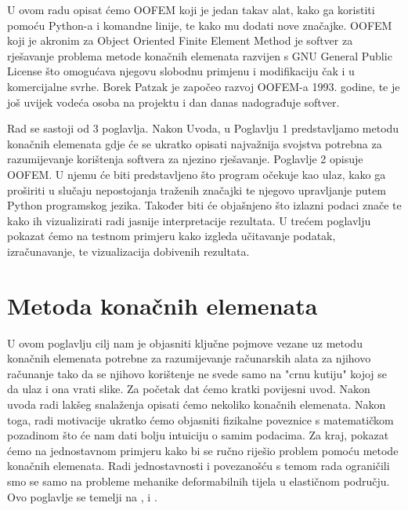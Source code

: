 \documentclass[a4paper,twoside,12pt]{memoir} %
\begin{document}
\begin{intro}
U ovom radu opisat ćemo OOFEM koji je jedan takav alat, kako ga koristiti pomoću Python-a i komandne linije, te kako mu dodati nove značajke. OOFEM koji je akronim za Object Oriented Finite Element Method je softver za rješavanje problema metode konačnih elemenata razvijen s GNU General Public License što omogućava njegovu slobodnu primjenu i modifikaciju čak i u komercijalne svrhe. Borek Patzak je  započeo razvoj OOFEM-a 1993. godine, te je još uvijek vodeća osoba na projektu i dan danas nadograđuje softver. \par

Rad se sastoji od 3 poglavlja. Nakon Uvoda, u Poglavlju 1 predstavljamo metodu konačnih elemenata gdje će se ukratko opisati najvažnija svojstva potrebna za razumijevanje korištenja softvera za njezino rješavanje. Poglavlje 2 opisuje OOFEM. U njemu će biti predstavljeno što program očekuje kao ulaz, kako ga proširiti u slučaju nepostojanja traženih značajki te njegovo upravljanje putem Python programskog jezika. Također biti će objašnjeno što izlazni podaci znače te kako ih vizualizirati radi jasnije interpretacije rezultata. U trećem poglavlju pokazat ćemo na testnom primjeru kako izgleda učitavanje podatak, izračunavanje, te vizualizacija dobivenih rezultata.

\end{intro}


\chapter{Metoda konačnih elemenata}	
U ovom poglavlju cilj nam je objasniti ključne pojmove vezane uz metodu konačnih elemenata potrebne za razumijevanje računarskih alata za njihovo računanje tako da se njihovo korištenje ne svede samo na "crnu kutiju" kojoj se da ulaz i ona vrati slike. Za početak dat ćemo kratki povijesni uvod. Nakon uvoda radi lakšeg snalaženja opisati ćemo nekoliko konačnih elemenata. Nakon toga, radi motivacije ukratko ćemo objasniti fizikalne poveznice s matematičkom pozadinom što će nam dati bolju intuiciju o samim podacima. Za kraj, pokazat ćemo na jednostavnom primjeru kako bi se ručno riješio problem pomoću metode konačnih elemenata. Radi jednostavnosti i povezanošću s temom rada ograničili smo se samo na probleme mehanike deformabilnih tijela u elastičnom području. Ovo poglavlje se temelji na \cite{jurica_soric}, \cite{coursera} i \cite{wiki_fem_18}.
\end{document}
